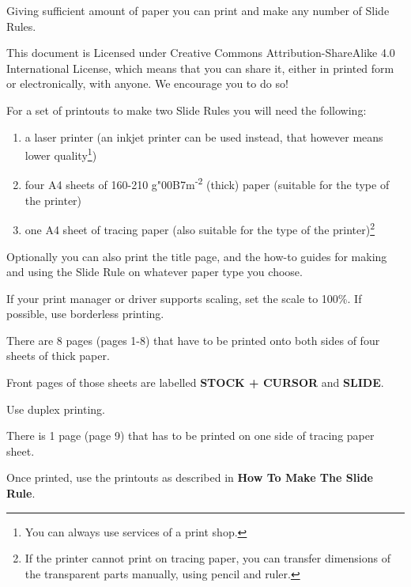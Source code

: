   \begin{multicols*}{3}
  \normalsize{

  Giving sufficient amount of paper you can print and make any number of Slide Rules.

This document is Licensed under Creative Commons Attribution-ShareAlike 4.0 International License, which means that you can share it, either in printed form or electronically, with anyone. We encourage you to do so!

  For a set of printouts to make two Slide Rules you will need the following:
    \begin{enumerate}
      \setlength{\parskip}{0pt}
      \setlength{\parsep}{0pt}
      \item a laser printer (an inkjet printer can be used instead, that however means lower quality\footnote{You can always use services of a print shop.})
      \item four A4 sheets of 160-210 g{\char"00B7}m\textsuperscript{-2} (thick) paper (suitable for the type of the printer)
      \item one A4 sheet of tracing paper (also suitable for the type of the printer)\footnote{If the printer cannot print on tracing paper, you can transfer dimensions of the transparent parts manually, using pencil and ruler.}
    \end{enumerate}

Optionally you can also print the title page, and the how-to guides for making and using the Slide Rule on whatever paper type you choose. 

If your print manager or driver supports scaling, set the scale to 100\%. If possible, use borderless printing.


There are 8 pages (pages 1-8) that have to be printed onto both sides of four sheets of thick paper.

Front pages of those sheets are labelled \textbf{STOCK + CURSOR} and \textbf{SLIDE}.

Use duplex printing.


There is 1 page (page 9) that has to be printed on one side of tracing paper sheet.


Once printed, use the printouts as described in \textbf{How To Make The Slide Rule}.

  }
  \end{multicols*}


